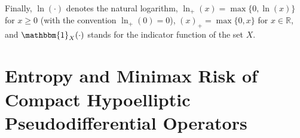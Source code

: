 \documentclass[a4paper,12pt]{article}
\newcommand{\N}{\mathbb{N}}
\newcommand{\R}{\mathbb{R}}
\begin{document}
Finally, $\ln(\cdot)$ denotes the natural logarithm,
$\ln_+(x) = \max\{0,\ln(x)\}$ for $x \ge 0$ (with the convention $\ln_+(0)=0$),
$(x)_+ = \max\{0,x\}$ for $x \in \R$,
and $\mathbbm{1}_X(\cdot)$ stands for the indicator function of the set $X$.

\section{Entropy and Minimax Risk of Compact Hypoelliptic Pseudodifferential Operators}\label{sec:main-results}
\end{document}
